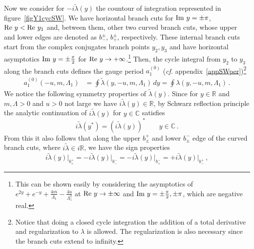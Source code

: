 \documentclass[11pt,a4paper]{elsarticle}
\def\Re{{\rm Re ~}}
\def\Im{{\rm Im ~}}
\numberwithin{figure}{section}
\numberwithin{table}{section}
\begin{document}
  Now we consider for $-i \tilde\lambda(y)$ the countour of integration represented in figure~\ref{figY1cycSW}. We have horizontal branch cuts for $\Im y = \pm \pi$, $ \Re y < \Re y_1$ and, between them, other two curved branch cuts, whose upper and lower edges are denoted as $b_-^\pm$, $b_+^\pm$, respectively. These internal branch cuts start from the complex conjugates branch points $y_{2},y_3$ and have horizontal asymptotics $\Im y = \pm \frac{\pi}{2}$ for $\Re y \to + \infty$.\footnote{This can be shown easily by considering the asymptotics of $e^{2 y}+e^{-y}+\frac{4 m}{\Lambda_1}-\frac{4 u}{\Lambda_1^2}$ at $\Re y \to \pm \infty$ and $\Im y = \pm \frac{\pi}{2}, \pm \pi$, which are negative real.} Then, the cycle integral from $y_2$ to $y_3$ along the branch cuts defines the gauge period $a_1^{(0)}$ (\textit{cf.} appendix~\ref{appSWper})\footnote{Notice that doing a closed cycle integration the addition of a total derivative and regularization to $ \lambda$ is allowed. The regularization is also necessary since the branch cuts extend to infinity.}%
\begin{align}
   a_1^{(0)}(-u,m,\Lambda_1) &=\oint \tilde{\lambda}(y,-u,m,\Lambda_1) \, dy=\oint \lambda(y,-u,m,\Lambda_1)\,.%
\end{align}
We notice the following symmetry properties of $\tilde{\lambda}(y)$. Since for $y \in \mathbb{R}$ and $m, \Lambda > 0$ and $u>0$ not large we have
$    i \tilde{\lambda}(y) \in \mathbb{R} $, by Schwarz reflection principle the analytic continuation of $i \tilde{\lambda}(y)$ for $y \in \mathbb{C}$ satisfies
\begin{equation}
    i \tilde{\lambda}(y^*) = ( i \tilde{\lambda}(y))^* \qquad y \in \mathbb{C}\,.
\end{equation}
From this it also follows that along the upper $b_\pm^+$ and lower $b_\pm^-$ edge of the curved branch cuts, where $i \tilde\lambda \in i \mathbb{R}$, we have the sign properties
\begin{equation}\label{lambdasym}
    i \tilde\lambda(y) \Bigr |_{b_+^+}=- i \tilde\lambda(y) \Bigr |_{b_-^-}=- i \tilde\lambda(y) \Bigr |_{b_+^-}=+ i \tilde\lambda(y) \Bigr |_{b_-^+}\,,%
\end{equation}
\end{document}
